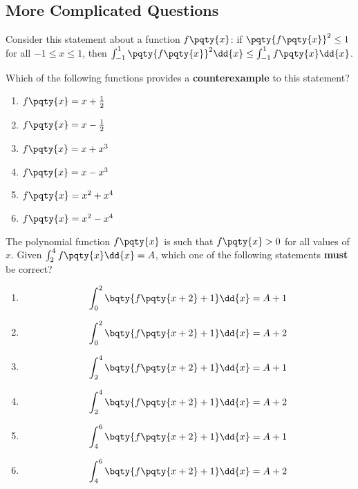 \documentclass{article}
\begin{document}
\subsection{More Complicated Questions}

\begin{example}[TMUA 2016 P2 Q18]
    Consider this statement about a function \(f\pqty{x}\): if \(\pqty{f\pqty{x}}^2 \leq 1\) for all \(-1 \leq x \leq 1\), then \(\int_{-1}^{1} \pqty{f\pqty{x}}^2 \dd{x} \leq \int_{-1}^{1} f\pqty{x} \dd{x}\).

    Which of the following functions provides a \textbf{counterexample} to this statement?
    
    \begin{enumerate}[label=\Alph*.]
        \item \(f\pqty{x} = x + \frac{1}{2}\)
        \item \(f\pqty{x} = x - \frac{1}{2}\)
        \item \(f\pqty{x} = x + x^3\)
        \item \(f\pqty{x} = x - x^3\)
        \item \(f\pqty{x} = x^2 + x^4\)
        \item \(f\pqty{x} = x^2 - x^4\)
    \end{enumerate}
\end{example}

\begin{example}[TMUA 2017 P1 Q12]
    The polynomial function \(f\pqty{x}\) is such that \(f\pqty{x} > 0\) for all values of \(x\). Given \(\int_2^4 f\pqty{x} \dd{x} = A\), which one of the following statements \textbf{must} be correct?
    \begin{enumerate}[label=\Alph*.]
        \item \[\int_{0}^{2} \bqty{f\pqty{x + 2} + 1} \dd{x} = A + 1\]
        \item \[\int_{0}^{2} \bqty{f\pqty{x + 2} + 1} \dd{x} = A + 2\]
        \item \[\int_{2}^{4} \bqty{f\pqty{x + 2} + 1} \dd{x} = A + 1\]
        \item \[\int_{2}^{4} \bqty{f\pqty{x + 2} + 1} \dd{x} = A + 2\]
        \item \[\int_{4}^{6} \bqty{f\pqty{x + 2} + 1} \dd{x} = A + 1\]
        \item \[\int_{4}^{6} \bqty{f\pqty{x + 2} + 1} \dd{x} = A + 2\]
    \end{enumerate}
\end{example}
\end{document}
